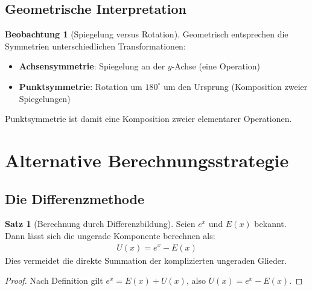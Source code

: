 ﻿\documentclass[a4paper,12pt]{article}
\theoremstyle{definition}
\newtheorem{satz}{Satz}
\newtheorem{beobachtung}{Beobachtung}
\begin{document}
\subsection{Geometrische Interpretation}

\begin{beobachtung}[Spiegelung versus Rotation]
Geometrisch entsprechen die Symmetrien unterschiedlichen Transformationen:
\begin{itemize}
  \item[-] \textbf{Achsensymmetrie}: Spiegelung an der $y$-Achse
           (eine Operation)
  \item[-] \textbf{Punktsymmetrie}: Rotation um $180^\circ$ um den Ursprung
           (Komposition zweier Spiegelungen)
\end{itemize}
Punktsymmetrie ist damit eine Komposition zweier elementarer Operationen.
\end{beobachtung}

\section{Alternative Berechnungsstrategie}

\subsection{Die Differenzmethode}

\begin{satz}[Berechnung durch Differenzbildung]
Seien $e^x$ und $E(x)$ bekannt. Dann lässt sich die ungerade Komponente
berechnen als:
\begin{align}
  U(x) = e^x - E(x)
\end{align}
Dies vermeidet die direkte Summation der komplizierten ungeraden Glieder.
\end{satz}

\begin{proof}
Nach Definition gilt $e^x = E(x) + U(x)$, also $U(x) = e^x - E(x)$.
\end{proof}
\end{document}
